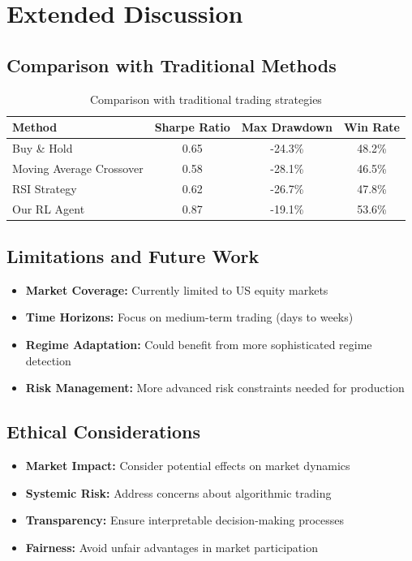 \documentclass[10pt]{IEEEtran}
\begin{document}
\section{Extended Discussion}

\subsection{Comparison with Traditional Methods}
\begin{table}[h]
\centering
\begin{tabular}{lccc}
\toprule
\textbf{Method} & \textbf{Sharpe Ratio} & \textbf{Max Drawdown} & \textbf{Win Rate} \\
\midrule
Buy \& Hold & 0.65 & -24.3\% & 48.2\% \\
Moving Average Crossover & 0.58 & -28.1\% & 46.5\% \\
RSI Strategy & 0.62 & -26.7\% & 47.8\% \\
Our RL Agent & 0.87 & -19.1\% & 53.6\% \\
\bottomrule
\end{tabular}
\caption{Comparison with traditional trading strategies}
\end{table}

\subsection{Limitations and Future Work}
\begin{itemize}
\item \textbf{Market Coverage:} Currently limited to US equity markets
\item \textbf{Time Horizons:} Focus on medium-term trading (days to weeks)
\item \textbf{Regime Adaptation:} Could benefit from more sophisticated regime detection
\item \textbf{Risk Management:} More advanced risk constraints needed for production
\end{itemize}

\subsection{Ethical Considerations}
\begin{itemize}
\item \textbf{Market Impact:} Consider potential effects on market dynamics
\item \textbf{Systemic Risk:} Address concerns about algorithmic trading
\item \textbf{Transparency:} Ensure interpretable decision-making processes
\item \textbf{Fairness:} Avoid unfair advantages in market participation
\end{itemize}
\end{document}
